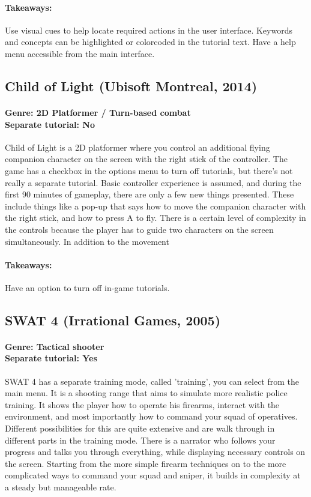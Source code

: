 \paragraph{Takeaways:}
Use visual cues to help locate required actions in the user interface. Keywords and concepts can be highlighted or colorcoded in the tutorial text. Have a help menu accessible from the main interface.

\subsection{Child of Light (Ubisoft Montreal, 2014)}
\paragraph{Genre: 2D Platformer / Turn-based combat \\ Separate tutorial: No \\}
Child of Light is a 2D platformer where you control an additional flying companion character on the screen with the right stick of the controller. The game has a checkbox in the options menu to turn off tutorials, but there's not really a separate tutorial. Basic controller experience is assumed, and during the first 90 minutes of gameplay, there are only a few new things presented. These include things like a pop-up that says how to move the companion character with the right stick, and how to press A to fly. There is a certain level of complexity in the controls because the player has to guide two characters on the screen simultaneously. In addition to the movement
\paragraph{Takeaways:}
Have an option to turn off in-game tutorials.

\subsection{SWAT 4 (Irrational Games, 2005)}
\paragraph{Genre: Tactical shooter \\ Separate tutorial: Yes \\}
SWAT 4 has a separate training mode, called 'training', you can select from the main menu. It is a shooting range that aims to simulate more realistic police training. It shows the player how to operate his firearms, interact with the environment, and most importantly how to command your squad of operatives. Different possibilities for this are quite extensive and are walk through in different parts in the training mode. There is a narrator who follows your progress and talks you through everything, while displaying necessary controls on the screen. Starting from the more simple firearm techniques on to the more complicated ways to command your squad and sniper, it builds in complexity at a steady but manageable rate.
